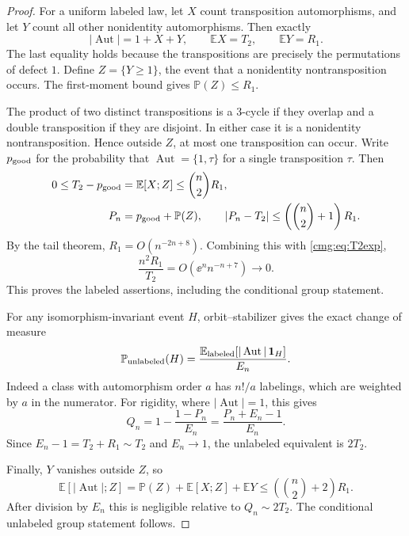 \documentclass[11pt,letterpaper]{article}
\numberwithin{equation}{section}
\theoremstyle{definition}\newtheorem{definition}[theorem]{Definition}
\theoremstyle{remark}\newtheorem{remark}[theorem]{Remark}
\newcommand{\E}{\mathbb E}\newcommand{\Prob}{\mathbb P}
\newcommand{\Aut}{\operatorname{Aut}}\newcommand{\Fix}{\operatorname{Fix}}
\begin{document}
\begin{proof}
For a uniform labeled law, let $X$ count transposition automorphisms, and let $Y$ count all other nonidentity automorphisms. Then exactly
\begin{equation}\label{cmg:eq:AXY}
 |\Aut|=1+X+Y,\qquad \E X=T_2,\qquad \E Y=R_1.
\end{equation}
The last equality holds because the transpositions are precisely the permutations of defect $1$. Define $Z=\{Y\ge1\}$, the event that a nonidentity nontransposition occurs. The first-moment bound gives $\Prob(Z)\le R_1$.

The product of two distinct transpositions is a $3$-cycle if they overlap and a double transposition if they are disjoint. In either case it is a nonidentity nontransposition. Hence outside $Z$, at most one transposition can occur. Write $p_{\rm good}$ for the probability that $\Aut=\{1,\tau\}$ for a single transposition $\tau$. Then
\begin{align}
 0\le T_2-p_{\rm good}&=\E[X;Z]\le\binom n2R_1,\label{cmg:eq:good}\\
 P_n&=p_{\rm good}+\Prob(Z),\qquad
 |P_n-T_2|\le\left(\binom n2+1\right)R_1.\label{cmg:eq:Pbound}
\end{align}
By the tail theorem, $R_1=O(n^{-2n+8})$. Combining this with \eqref{cmg:eq:T2exp},
\[
 \frac{n^2R_1}{T_2}=O\!\left(\ee^n n^{-n+7}\right)\longrightarrow0.
\]
This proves the labeled assertions, including the conditional group statement.

For any isomorphism-invariant event $H$, orbit--stabilizer gives the exact change of measure
\begin{equation}\label{cmg:eq:measure}
 \Prob_{\rm unlabeled}(H)=\frac{\E_{\rm labeled}[|\Aut|\,\mathbf1_H]}{E_n}.
\end{equation}
Indeed a class with automorphism order $a$ has $n!/a$ labelings, which are weighted by $a$ in the numerator. For rigidity, where $|\Aut|=1$, this gives
\begin{equation}\label{cmg:eq:Qexact}
 Q_n=1-\frac{1-P_n}{E_n}=\frac{P_n+E_n-1}{E_n}.
\end{equation}
Since $E_n-1=T_2+R_1\sim T_2$ and $E_n\to1$, the unlabeled equivalent is $2T_2$.

Finally, $Y$ vanishes outside $Z$, so
\begin{equation}\label{cmg:eq:exceptional}
 \E[|\Aut|;Z]=\Prob(Z)+\E[X;Z]+\E Y
 \le\left(\binom n2+2\right)R_1.
\end{equation}
After division by $E_n$ this is negligible relative to $Q_n\sim2T_2$. The conditional unlabeled group statement follows.
\end{proof}
\end{document}
